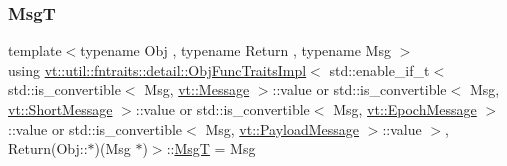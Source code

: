 \subsubsection{\texorpdfstring{MsgT}{MsgT}}
{\footnotesize\ttfamily template$<$typename Obj , typename Return , typename Msg $>$ \\
using \hyperlink{structvt_1_1util_1_1fntraits_1_1detail_1_1_obj_func_traits_impl}{vt\+::util\+::fntraits\+::detail\+::\+Obj\+Func\+Traits\+Impl}$<$ std\+::enable\+\_\+if\+\_\+t$<$ std\+::is\+\_\+convertible$<$ Msg, \hyperlink{namespacevt_a3a3ddfef40b4c90915fa43cdd5f129ea}{vt\+::\+Message} $>$\+::value or std\+::is\+\_\+convertible$<$ Msg, \hyperlink{namespacevt_a1125ac1da6c0bbf141e0ea0739d7602d}{vt\+::\+Short\+Message} $>$\+::value or std\+::is\+\_\+convertible$<$ Msg, \hyperlink{namespacevt_ad67368ffae52d7325002586b41bb150e}{vt\+::\+Epoch\+Message} $>$\+::value or std\+::is\+\_\+convertible$<$ Msg, \hyperlink{namespacevt_a89a92229c5622b855c02c549f83a1a68}{vt\+::\+Payload\+Message} $>$\+::value $>$, Return(Obj\+::$\ast$)(Msg $\ast$)$>$\+::\hyperlink{structvt_1_1util_1_1fntraits_1_1detail_1_1_obj_func_traits_impl_3_01std_1_1enable__if__t_3_01std50180eda0449a3437a18b4857773a769_a319c70f1ad557eb4e19c487347c6e0e3}{MsgT} =  Msg}

